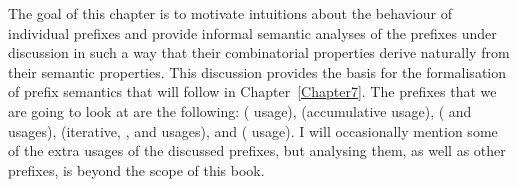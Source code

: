  

The goal of this chapter is to motivate intuitions about the behaviour of individual prefixes and provide informal semantic analyses of the prefixes under discussion in such a way that their combinatorial properties derive naturally from their semantic properties. 
This discussion provides the basis for the formalisation of prefix semantics that will follow in Chapter~\ref{Chapter7}. The prefixes that we are going to look at are the following:  ( usage),  (accumulative usage),  ( and  usages),  (iterative, , and  usages), and  ( usage). I will occasionally mention some of the extra usages of the discussed prefixes, but analysing them, as well as other prefixes, is beyond the scope of this book.

